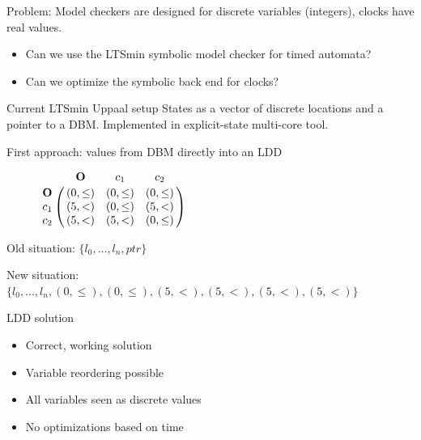 \begin{frame}
Problem: Model checkers are designed for discrete variables (integers), clocks have real values.
\begin{itemize}
\item Can we use the LTSmin symbolic model checker for timed automata?
\item Can we optimize the symbolic back end for clocks?
\end{itemize}
\end{frame}

\begin{frame}{Current LTSmin Uppaal setup}
States as a vector of discrete locations and a pointer to a DBM.
Implemented in explicit-state multi-core tool.

First approach: values from DBM directly into an LDD
\end{frame}

\begin{frame}
\begin{figure}
	\centering
	\begin{math}
 \bordermatrix{ 		                 & \mathbf{O} & c_1           & c_2        \cr
 			\mathbf{O} &(0,\leq)      & (0,\leq)      & (0,\leq)     \cr
 			c_1        &(5,<)      & (0,\leq)      & (5,<)\cr
 			c_2        &(5,<)      & (5,<) & (0,\leq)     \cr}
	\end{math}
\end{figure}
Old situation: $\{l_0,...,l_n,ptr\}$

New situation: $\{l_0,...,l_n,(0,\leq),(0,\leq),(5,<),(5,<),(5,<),(5,<)\}$
\end{frame}

\begin{frame}{LDD solution}
\begin{itemize}
	\item Correct, working solution
	\item Variable reordering possible
	\item All variables seen as discrete values
	\item No optimizations based on time
\end{itemize}
\end{frame}


